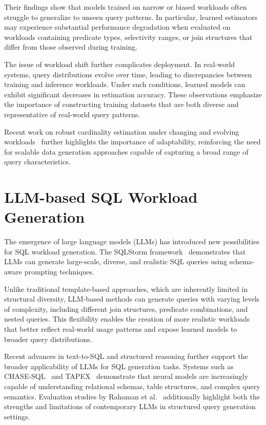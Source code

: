 Their findings show that models trained on narrow or biased workloads often struggle to generalize to unseen query patterns. In particular, learned estimators may experience substantial performance degradation when evaluated on workloads containing predicate types, selectivity ranges, or join structures that differ from those observed during training.

The issue of workload shift further complicates deployment. In real-world systems, query distributions evolve over time, leading to discrepancies between training and inference workloads. Under such conditions, learned models can exhibit significant decreases in estimation accuracy. These observations emphasize the importance of constructing training datasets that are both diverse and representative of real-world query patterns.

Recent work on robust cardinality estimation under changing and evolving workloads~\cite{DBLP:journals/pvldb/NegiWKTMMKA23} further highlights the importance of adaptability, reinforcing the need for scalable data generation approaches capable of capturing a broad range of query characteristics.

\section{LLM-based SQL Workload Generation}

The emergence of large language models (LLMs) has introduced new possibilities for SQL workload generation. The SQLStorm framework~\cite{DBLP:journals/pvldb/SchmidtLBN25} demonstrates that LLMs can generate large-scale, diverse, and realistic SQL queries using schema-aware prompting techniques.

Unlike traditional template-based approaches, which are inherently limited in structural diversity, LLM-based methods can generate queries with varying levels of complexity, including different join structures, predicate combinations, and nested queries. This flexibility enables the creation of more realistic workloads that better reflect real-world usage patterns and expose learned models to broader query distributions.

Recent advances in text-to-SQL and structured reasoning further support the broader applicability of LLMs for SQL generation tasks. Systems such as CHASE-SQL~\cite{DBLP:conf/iclr/PourrezaL0CTKGS25} and TAPEX~\cite{DBLP:conf/iclr/LiuCGZLCL22} demonstrate that neural models are increasingly capable of understanding relational schemas, table structures, and complex query semantics. Evaluation studies by Rahaman et al.~\cite{DBLP:conf/edbt/RahmanZMCP25} additionally highlight both the strengths and limitations of contemporary LLMs in structured query generation settings.


